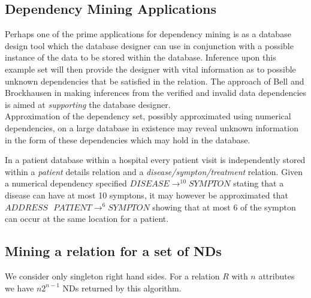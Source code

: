 \subsection{Dependency Mining Applications}\label{subsec:fd_jobs}

Perhaps one of the prime applications for dependency mining is as a database
design tool which the database designer can use in conjunction with a possible
instance of the data to be stored within the database.  Inference upon this 
example set will then provide the designer with vital information as to possible
unknown dependencies that be satisfied in the relation. The approach of 
Bell and Brockhausen \cite{bb95} in making inferences from the verified and
invalid data dependencies is aimed at {\em supporting} the database
designer. \\

Approximation of the dependency set, possibly approximated using numerical
dependencies, on a large database in existence may reveal unknown information
in the form of these dependencies which may hold in the database.  

\begin{example}
\begin{rm}
In a patient database within a hospital every patient visit is independently stored
within a {\em patient} details relation and a {\em disease/sympton/treatment} relation. 
Given a numerical dependency specified $DISEASE \to^{10} SYMPTON$ stating
that a disease can have at most 10 symptons, it may however be approximated
that $ADDRESS \: \: \: PATIENT \to^{6} SYMPTON$ showing that at most
6 of the sympton can occur at the same location for a patient.
\end{rm}
\end{example}


\subsection{Mining a relation for a set of NDs}

We consider only singleton right hand sides. For a relation $R$ with
$n$ attributes we have $n 2^{n-1}$ NDs returned by this algorithm.

\medskip

